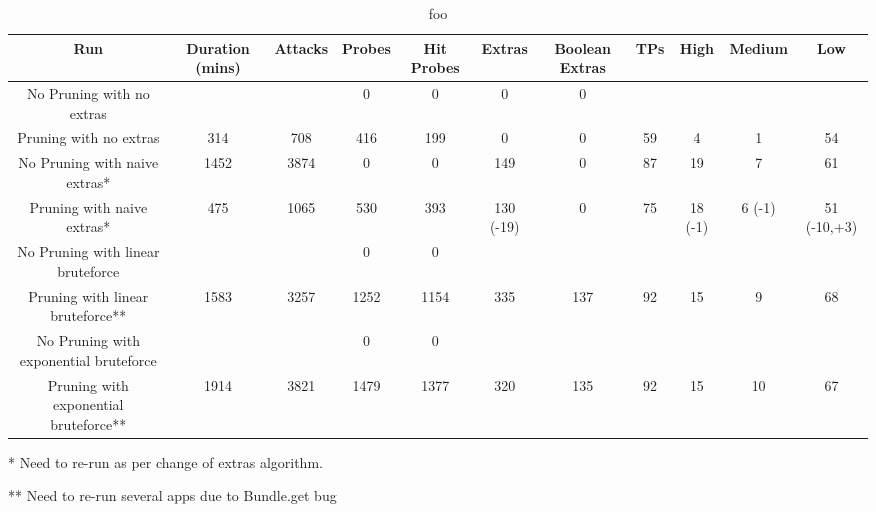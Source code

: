 \begin{table*}
\begin{center}
\begin{tabular}{|c|c|c|c|c|c|c|c|c|c|c|}
\hline 
Run & Duration (mins) & Attacks & Probes & Hit Probes & Extras & Boolean Extras & TPs & High & Medium & Low\tabularnewline
\hline 
\hline 
No Pruning with no extras &  &  & 0 & 0 & 0 & 0 &  &  &  & \tabularnewline
\hline 
Pruning with no extras & 314 & 708 & 416 & 199 & 0 & 0 & 59 & 4 & 1 & 54\tabularnewline
\hline 
No Pruning with naive extras{*} & 1452 & 3874 & 0 & 0 & 149 & 0 & 87 & 19 & 7 & 61\tabularnewline
\hline 
Pruning with naive extras{*} & 475 & 1065 & 530 & 393 & 130 (-19) & 0 & 75 & 18 (-1) & 6 (-1) & 51 (-10,+3)\tabularnewline
\hline 
No Pruning with linear bruteforce &  &  & 0 & 0 &  &  &  &  &  & \tabularnewline
\hline 
Pruning with linear bruteforce{*}{*} & 1583 & 3257 & 1252 & 1154 & 335 & 137 & 92 & 15 & 9 & 68\tabularnewline
\hline 
No Pruning with exponential bruteforce &  &  & 0 & 0 &  &  &  &  &  & \tabularnewline
\hline 
Pruning with exponential bruteforce{*}{*} & 1914 & 3821 & 1479 & 1377 & 320 & 135 & 92 & 15 & 10 & 67\tabularnewline
\hline 
\end{tabular}
\caption{foo}
\end{center}
\end{table*}

{*} Need to re-run as per change of extras algorithm.

{*}{*} Need to re-run several apps due to Bundle.get bug
